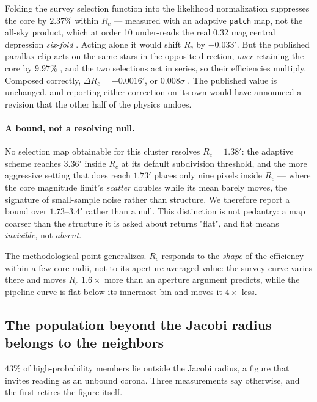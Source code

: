 \documentclass{aa}
\begin{document}
Folding the survey selection function into the likelihood normalization suppresses the core by
$2.37\%$ within $R_c$ --- measured with an adaptive \texttt{patch} map, not the all-sky product,
which at order 10 under-reads the real $0.32$ mag central depression \emph{six-fold}
. Acting alone it would shift $R_c$ by $-0.033'$. But the published parallax clip acts on the same
stars in the opposite direction, \emph{over}-retaining the core by $9.97\%$
, and the two selections act in series, so their efficiencies multiply. Composed correctly,
$\Delta R_c = +0.0016'$, or $0.008\sigma$
. The published value is unchanged, and reporting either correction on its own would have
announced a revision that the other half of the physics undoes.

\paragraph{A bound, not a resolving null.} No selection map obtainable for this cluster resolves
$R_c = 1.38'$: the adaptive scheme reaches $3.36'$ inside $R_c$ at its default subdivision
threshold, and the more aggressive setting that does reach $1.73'$ places only nine pixels inside
$R_c$ --- where the core magnitude limit's \emph{scatter} doubles while its mean barely moves, the
signature of small-sample noise rather than structure. We therefore report a bound over
$1.73$--$3.4'$ rather than a null. This distinction is not pedantry: a map coarser than the
structure it is asked about returns "flat", and flat means \emph{invisible}, not \emph{absent}.

The methodological point generalizes. $R_c$ responds to the \emph{shape} of the efficiency within
a few core radii, not to its aperture-averaged value: the survey curve varies there and moves
$R_c$ $1.6\times$ more than an aperture argument predicts, while the pipeline curve is flat below
its innermost bin and moves it $4\times$ less.

\subsection{The population beyond the Jacobi radius belongs to the neighbors}
\label{sec:b1}

$43\%$ of high-probability members lie outside the Jacobi radius, a figure that invites reading as
an unbound corona. Three measurements say otherwise, and the first retires the figure itself.
\end{document}
